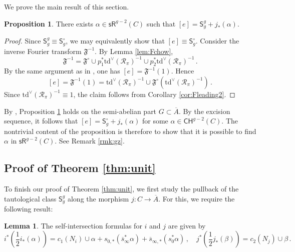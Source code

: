 \documentclass[11pt]{article}
\def\CH{\mathsf{CH}}
\def\sR{\mathsf{sR}}
\def\Td{\mathrm{td}}
\def\fm{\mathfrak{F}}
\def\cR{\mathcal{R}}
\newcommand{\barA}{\overline{A}}
\newcommand{\sfS}{\mathsf{S}}
\newcommand{\sbar}{\overline{s}}
\theoremstyle{definition}
\newtheorem{proposition}[definition]{Proposition}
\newtheorem{lemma}[definition]{Lemma}
\begin{document}
We prove the main result of this section.

\begin{proposition}\label{pro:ecorrect}
    There exists $\alpha\in \sR^{g-2}(C)$ such that $[e] = \sfS^g_g + j_*(\alpha)$.
\end{proposition}

\begin{proof}
    Since $\sfS^g_g \equiv \sfS_g^\circ$, we may equivalently show that $[e] \equiv \sfS^\circ_g$. Consider the inverse Fourier transform $\fm^{-1}$. By Lemma \ref{lem:Fchow},
    \[
    \fm^{-1} = \fm^\circ \cup p_1^*\Td^\vee(\cR_\pi)^{-1} \cup p_2^*\Td^\vee(\cR_\pi)^{-1}\,.
    \]
    By the same argument as in \cite[Proposition~5.2]{BMP}, one has $[e] = \fm^{-1}(1)$. Hence
    \[
    [e] = \fm^{-1}(1) = \Td^\vee(\cR_\pi)^{-1} \cup \fm^\circ(\Td^\vee(\cR_\pi)^{-1})\,.
    \]
    Since $\Td^\vee(\cR_\pi)^{-1} \equiv 1$, the claim follows from Corollary \ref{cor:Fleading2}.
\end{proof}

By \cite[Theorem 1.6]{BMP}, Proposition \ref{pro:ecorrect} holds on the semi-abelian part $ G \subset \barA$. By the excision sequence, it follows that $[e]= \sfS^\circ_g + j_*(\alpha)$ for some $\alpha\in \CH^{g-2}(C)$. The nontrivial content of the proposition is therefore to show that it is possible to find $\alpha$ in $\sR^{g-2}(C)$. See Remark \ref{rmk:gz}.

\subsection{Proof of Theorem \ref{thm:unit}}\label{sec:proofA}
To finish our proof of Theorem \ref{thm:unit}, we first study the pullback of the tautological class $\sfS_g^g$ along the morphism $j: C\to \barA$. For this, we require the following result:

\begin{lemma}\label{lem:self-In}
    The self-intersection formulas for $i$ and $j$ are given by
    $$
    i^*\left(\frac{1}{2}i_*(\alpha)\right) = c_1(N_i)\cup\alpha + s_{0,*}(\sbar_{\infty}^*\alpha) + \sbar_{\infty,*}(s_0^*\alpha)\, ,\quad j^*\left(\frac{1}{2}j_*(\beta)\right) = c_2(N_j)\cup\beta\,.
    $$
\end{lemma}
\end{document}
